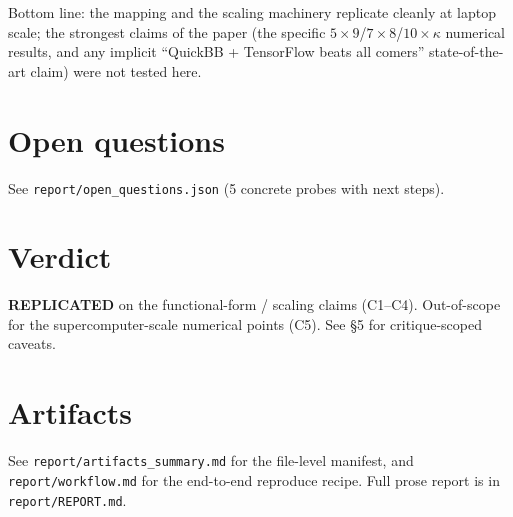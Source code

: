 \documentclass[11pt]{article}
\begin{document}
Bottom line: the mapping and the scaling machinery replicate cleanly at
laptop scale; the strongest claims of the paper (the specific
$5{\times}9$/$7{\times}8$/$10{\times}\kappa$ numerical results, and any
implicit ``QuickBB + TensorFlow beats all comers'' state-of-the-art claim)
were not tested here.

\section{Open questions}
See \texttt{report/open\_questions.json} (5 concrete probes with next steps).

\section{Verdict}
\textbf{REPLICATED} on the functional-form / scaling claims (C1--C4).
Out-of-scope for the supercomputer-scale numerical points (C5). See
\S5 for critique-scoped caveats.

\section{Artifacts}
See \texttt{report/artifacts\_summary.md} for the file-level manifest, and
\texttt{report/workflow.md} for the end-to-end reproduce recipe. Full
prose report is in \texttt{report/REPORT.md}.
\end{document}
